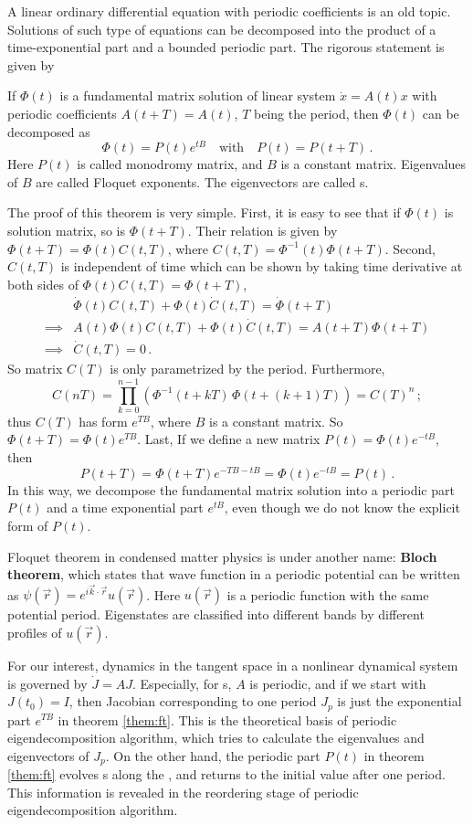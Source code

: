 A linear ordinary differential equation with periodic
coefficients is an old topic. Solutions of such type of
equations can be decomposed into the product of 
a time-exponential part
and a bounded periodic part. The rigorous statement is given by
\begin{theorem}\cite{Floquet1883}
  \label{them:ft}
  If $\Phi(t)$ is a fundamental matrix solution of linear system
  $\dot{x} = A(t)x$ with periodic coefficients $A(t+T)=A(t)$,
  $T$ being the period, then $\Phi(t)$ can be decomposed as
  \[
    \Phi(t) = P(t)e^{tB} \quad \text{with} \quad P(t) = P(t+T)
    \,.
  \]
  Here $P(t)$ is called monodromy matrix, and $B$ is a constant
  matrix. Eigenvalues of $B$ are called Floquet exponents. The
  eigenvectors are called \Fv s.
\end{theorem}
The proof of this theorem is very simple. First, it is easy to
see that if $\Phi(t)$ is solution matrix, so is $\Phi(t+T)$.
Their relation is given by $\Phi(t+T)=\Phi(t)C(t, T)$, where
$C(t, T) = \Phi^{-1}(t)\Phi(t+T)$. Second, $C(t, T)$ is independent
of time which can be shown by taking time derivative
at both sides of $\Phi(t)C(t, T) = \Phi(t+T)$, 
\begin{align*}
  & \dot{\Phi}(t)C(t, T) + \Phi(t)\dot{C}(t, T) = \dot{\Phi}(t+T) \\
  \implies 
  &  A(t) \Phi(t) C(t, T) + \Phi(t)\dot{C}(t, T) = A(t + T)\Phi(t+T) \\
  \implies
  & \dot{C}(t, T) = 0 \,.
\end{align*}
So matrix $C(T)$
is only parametrized by the period. Furthermore,
\[
  C(nT) = \prod_{k=0}^{n-1}\left( \Phi^{-1}(t+kT) \, \Phi(t+(k+1)T) \right) = C(T)^n
  \,;
\]
thus $C(T)$ has form $e^{TB}$, where $B$ is a constant matrix.
So $\Phi(t+T)=\Phi(t)e^{TB}$. Last,
If we define a new matrix $P(t) = \Phi(t)e^{-tB}$, then
\[
  P(t+T) = \Phi(t+T)e^{-TB-tB} = \Phi(t)e^{-tB} = P(t) 
  \,.
\] 
In this way,
we decompose the fundamental matrix solution into a periodic part
$P(t)$
and a time exponential part $e^{tB}$,
even though we do not know the explicit
form of $P(t)$.

Floquet theorem in condensed matter physics is under another 
name: \textbf{Bloch theorem}, which states that wave function in a periodic
potential can be written as
$\psi(\vec{r}) = e^{i\vec{k}\cdot\vec{r}}u(\vec{r})$.
Here $u(\vec{r})$ is a periodic function with the same potential period.
Eigenstates are classified into different bands by different profiles of
$u(\vec{r})$.

For our interest, dynamics in the tangent space
in a nonlinear dynamical system is governed by $\dot{J} = A J$.
Especially, for \po s, $A$ is periodic, and if we start
with $J(t_0) = I$, then Jacobian corresponding to one period $J_p$ is
just the exponential part $e^{TB}$ in theorem \ref{them:ft}.
This is the theoretical basis of periodic eigendecomposition algorithm,
which tries to calculate the eigenvalues and eigenvectors of $J_p$.
On the other hand, the periodic part $P(t)$ in theorem \ref{them:ft}
evolves \Fv s along the \po, and returns to
the initial value after one period. This information is revealed
in the reordering stage of periodic eigendecomposition algorithm.
